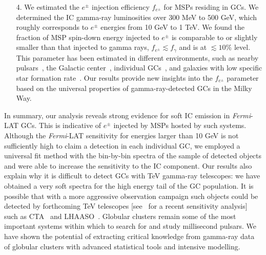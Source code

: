 \documentclass[doublespace,nopageskip]{VTthesis} %
\begin{document}
\begin{itemize}
    \item[4.] We estimated the $e^\pm$ injection efficiency $f_{e^\pm}$ for MSPs residing in GCs. We determined the IC gamma-ray luminosities over 300 MeV to 500 GeV, which roughly corresponds to $e^\pm$ energies from 10 GeV to 1 TeV. We found the fraction of MSP spin-down energy injected to $e^\pm$ is comparable to or slightly smaller than that injected to gamma rays, $f_{e^\pm} \lesssim f_\gamma$ and is at $\lesssim 10\%$ level. This parameter has been estimated in different environments, such as {nearby pulsars~\citep{2017PhRvD..96j3013H, 2018PhRvD..98d3005H, 2021arXiv210400014H}}, the Galactic center~\citep{2013MNRAS.435L..14B}, individual GCs~\citep{2019MNRAS.484.2876M}, and galaxies with low specific star formation rate~\citep{2020arXiv200508982S}. Our results provide new insights into the $f_{e^\pm}$ parameter based on the universal properties of gamma-ray-detected GCs in the Milky Way.
\end{itemize}

In summary, our analysis reveals strong evidence for {soft} IC emission in \textit{Fermi}-LAT GCs. This is indicative of $e^\pm$ injected by MSPs hosted by such systems. Although the {\it Fermi}-LAT sensitivity for energies larger than 10 GeV is not sufficiently high to claim a detection in each individual GC, we employed a universal fit method with the bin-by-bin spectra of the sample of detected objects and were able to increase the sensitivity to the IC component. Our results also explain why it is difficult to detect GCs with TeV gamma-ray telescopes: we have obtained a very soft spectra for the high energy tail of the GC population. It is possible that with a more aggressive observation campaign such objects could be detected by forthcoming TeV telescopes [see~\citep{2018MNRAS.473..897N} for a recent sensitivity analysis] such as CTA~\citep{2019scta.book.....C} and LHAASO~\citep{2019arXiv190502773B}. Globular clusters remain some of the most important systems within which to search for and study millisecond pulsars. We have shown the potential of extracting critical knowledge from gamma-ray data of globular clusters with advanced statistical tools and intensive modelling. 

\end{document}
